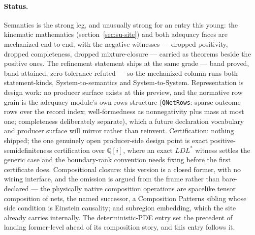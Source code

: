 \paragraph{Status.} Semantics is the strong leg, and unusually
strong for an entry this young: the kinematic mathematics
(section~\ref{sec:su-site}) and both adequacy faces are mechanized
end to end, with the negative witnesses --- dropped positivity,
dropped completeness, dropped mixture-closure --- carried as
theorems beside the positive ones. The refinement statement ships at
the same grade --- band proved, band attained, zero tolerance
refuted --- so the mechanized column runs both statement-kinds,
System-to-semantics and System-to-System. Representation is design
work:
no producer surface exists at this preview, and the normative row
grain is the adequacy module's own rows structure
(\texttt{QNetRows}: sparse outcome rows over the record index;
well-formedness as nonnegativity plus mass at most one; completeness
deliberately separate), which a future declaration vocabulary and
producer surface will mirror rather than reinvent. Certification:
nothing shipped; the one genuinely open producer-side design point
is exact positive-semidefiniteness certification over
$\mathbb{Q}[i]$, where an exact $LDL^{*}$ witness settles the
generic case and the boundary-rank convention needs fixing before
the first certificate does. Compositional closure: this version is
a closed former, with no wiring interface, and the omission is
argued from the frame rather than bare-declared --- the physically
native composition operations are spacelike tensor composition of
nets, the named successor, a Composition Patterns sibling whose side
condition is Einstein causality; and subregion embedding, which the
site already carries internally. The deterministic-PDE entry set the
precedent of landing former-level ahead of its composition story,
and this entry follows it.

